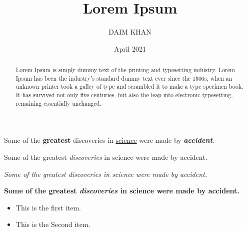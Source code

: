 \documentclass[12pt, a4paper ]{article}
\title{Lorem Ipsum}
\author{DAIM KHAN}
\date{April 2021}
\begin{document}
\maketitle



\begin{abstract}

Lorem Ipsum is simply dummy text of the printing and typesetting industry. Lorem Ipsum has been the industry's standard dummy text ever since the 1500s, when an unknown printer took a galley of type and scrambled it to make a type specimen book. It has survived not only five centuries, but also the leap into electronic typesetting, remaining essentially unchanged. 

\end{abstract}



\newline
Some of the \textbf{greatest}
discoveries in \underline{science} 
were made by \textbf{\textit{accident}}.


Some of the greatest \emph{discoveries} 
in science 
were made by accident.

\textit{Some of the greatest \emph{discoveries} 
in science 
were made by accident.}

\textbf{Some of the greatest \emph{discoveries} 
in science 
were made by accident.}








\begin{itemize}
  \item This is the first item.
  \item This is the Second item.
\end{itemize}



\end{document}
